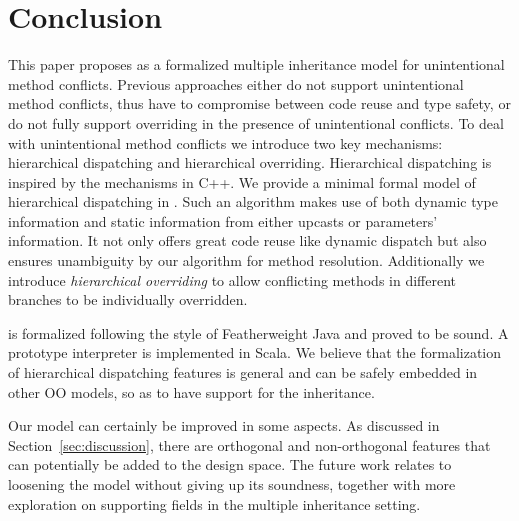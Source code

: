 \section{Conclusion}


This paper proposes \MIM{} as a formalized multiple inheritance model for
unintentional method conflicts. Previous approaches 
either do not support unintentional method conflicts, thus have to
compromise between code reuse and type safety, or do not fully support
overriding in the presence of unintentional conflicts. To deal with unintentional method conflicts we
introduce two key mechanisms: hierarchical dispatching and
hierarchical overriding. Hierarchical dispatching is inspired by the
mechanisms in C++. We provide a minimal formal model of hierarchical
dispatching in \MIM{}. Such an algorithm makes use of both dynamic type
information and static information from either upcasts or parameters'
information. It not only offers great code reuse like
dynamic dispatch but also ensures unambiguity by our algorithm for
method resolution. Additionally we introduce \emph{hierarchical
  overriding} to allow conflicting methods in different branches to be
individually overridden.

\MIM{} is formalized following the style of
Featherweight Java and proved to be sound. A prototype interpreter is
implemented in Scala. We believe that the formalization of
hierarchical dispatching features is general and
can be safely embedded in other OO models, so as to have support for the \wordfork{}
inheritance.

Our model can certainly be improved in some aspects. 
As discussed in Section~\ref{sec:discussion}, there are orthogonal and
non-orthogonal features that can potentially be added to the design space. 
The future work relates to loosening the model without giving up its soundness,
together with more exploration on supporting fields in the multiple inheritance setting.
